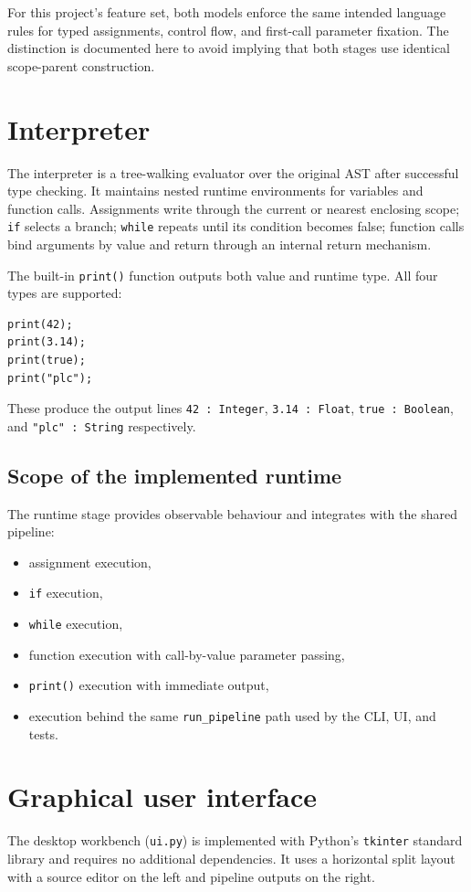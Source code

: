 For this project's feature set, both models enforce the same intended language
rules for typed assignments, control flow, and first-call parameter fixation.
The distinction is documented here to avoid implying that both stages use
identical scope-parent construction.

\section{Interpreter}
The interpreter is a tree-walking evaluator over the original AST after
successful type checking. It maintains
nested runtime environments for variables and function calls. Assignments write
through the current or nearest enclosing scope; \texttt{if} selects a branch;
\texttt{while} repeats until its condition becomes false; function calls bind
arguments by value and return through an internal return mechanism.

The built-in \texttt{print()} function outputs both value and runtime type.
All four types are supported:

\begin{lstlisting}
print(42);
print(3.14);
print(true);
print("plc");
\end{lstlisting}

\noindent These produce the output lines \texttt{42 : Integer}, \texttt{3.14 : Float}, \texttt{true : Boolean}, and \texttt{"plc" : String} respectively.

\subsection{Scope of the implemented runtime}
The runtime stage provides observable behaviour and integrates with the shared
pipeline:

\begin{itemize}
	\item assignment execution,
	\item \texttt{if} execution,
	\item \texttt{while} execution,
	\item function execution with call-by-value parameter passing,
	\item \texttt{print()} execution with immediate output,
	\item execution behind the same \texttt{run\_pipeline} path used by the CLI,
	UI, and tests.
\end{itemize}

\section{Graphical user interface}
The desktop workbench (\texttt{ui.py}) is implemented with Python's
\texttt{tkinter} standard library and requires no additional dependencies.
It uses a horizontal split layout with a source editor on the left and
pipeline outputs on the right.

